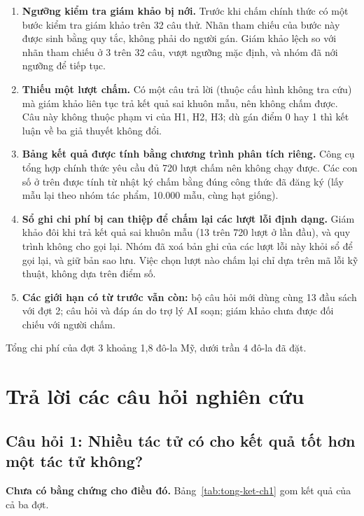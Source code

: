 \begin{enumerate}
    \item \textbf{Ngưỡng kiểm tra giám khảo bị nới.} Trước khi chấm chính thức có một bước kiểm tra giám khảo trên 32 câu thử. Nhãn tham chiếu của bước này được sinh bằng quy tắc, không phải do người gán. Giám khảo lệch so với nhãn tham chiếu ở 3 trên 32 câu, vượt ngưỡng mặc định, và nhóm đã nới ngưỡng để tiếp tục.
    \item \textbf{Thiếu một lượt chấm.} Có một câu trả lời (thuộc cấu hình không tra cứu) mà giám khảo liên tục trả kết quả sai khuôn mẫu, nên không chấm được. Câu này không thuộc phạm vi của H1, H2, H3; dù gán điểm 0 hay 1 thì kết luận về ba giả thuyết không đổi.
    \item \textbf{Bảng kết quả được tính bằng chương trình phân tích riêng.} Công cụ tổng hợp chính thức yêu cầu đủ 720 lượt chấm nên không chạy được. Các con số ở trên được tính từ nhật ký chấm bằng đúng công thức đã đăng ký (lấy mẫu lại theo nhóm tác phẩm, 10.000 mẫu, cùng hạt giống).
    \item \textbf{Sổ ghi chi phí bị can thiệp để chấm lại các lượt lỗi định dạng.} Giám khảo đôi khi trả kết quả sai khuôn mẫu (13 trên 720 lượt ở lần đầu), và quy trình không cho gọi lại. Nhóm đã xoá bản ghi của các lượt lỗi này khỏi sổ để gọi lại, và giữ bản sao lưu. Việc chọn lượt nào chấm lại chỉ dựa trên mã lỗi kỹ thuật, không dựa trên điểm số.
    \item \textbf{Các giới hạn có từ trước vẫn còn:} bộ câu hỏi mới dùng cùng 13 đầu sách với đợt 2; câu hỏi và đáp án do trợ lý AI soạn; giám khảo chưa được đối chiếu với người chấm.
\end{enumerate}

Tổng chi phí của đợt 3 khoảng 1,8 đô-la Mỹ, dưới trần 4 đô-la đã đặt.

\section{Trả lời các câu hỏi nghiên cứu}

\subsection{Câu hỏi 1: Nhiều tác tử có cho kết quả tốt hơn một tác tử không?}

\textbf{Chưa có bằng chứng cho điều đó.} Bảng~\ref{tab:tong-ket-ch1} gom kết quả của cả ba đợt.


